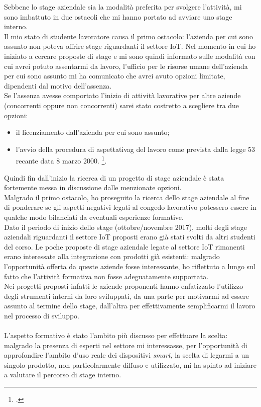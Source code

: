 Sebbene lo stage aziendale sia la modalità preferita per svolgere l'attività, mi sono imbattuto in due ostacoli che mi hanno portato ad avviare uno stage interno. \\
Il mio stato di studente lavoratore causa il primo ostacolo: l'azienda per cui sono assunto non poteva offrire stage riguardanti il settore IoT.
Nel momento in cui ho iniziato a cercare proposte di stage e mi sono quindi informato sulle modalità con cui avrei potuto assentarmi da lavoro,
l'ufficio per le risorse umane dell'azienda per cui sono assunto mi ha comunicato che avrei avuto opzioni limitate, dipendenti dal motivo dell'assenza. \\
Se l'assenza avesse comportato l'inizio di attività lavorative per altre aziende (concorrenti oppure non concorrenti) sarei stato costretto a scegliere tra due opzioni:
\begin{itemize}
  \item il licenziamento dall'azienda per cui sono assunto;
  \item l'avvio della procedura di \gls{aspettativag} del lavoro come prevista dalla legge 53 recante data 8 marzo 2000. \footcite{site:aspettativa}.
\end{itemize}
Quindi fin dall'inizio la ricerca di un progetto di stage aziendale è stata fortemente messa in discussione dalle menzionate opzioni. \\
Malgrado il primo ostacolo, ho proseguito la ricerca dello stage aziendale al fine di ponderare se gli aspetti negativi legati al congedo lavorativo potessero essere in qualche modo bilanciati da eventuali esperienze formative.
\\
Dato il periodo di inizio dello stage (ottobre/novembre 2017), molti degli stage aziendali riguardanti il settore IoT proposti erano già stati svolti da altri studenti del corso.
Le poche proposte di stage aziendale legate al settore IoT rimanenti erano interessate alla integrazione con prodotti già esistenti:
malgrado l'opportunità offerta da queste aziende fosse interessante, ho riflettuto a lungo sul fatto che l'attività formativa non fosse adeguatamente supportata. \\
Nei progetti proposti infatti le aziende proponenti hanno enfatizzato l'utilizzo degli strumenti interni da loro sviluppati, da una parte per motivarmi ad essere assunto al termine dello stage,
dall'altra per effettivamente semplificarmi il lavoro nel processo di sviluppo. \\ \\
L'aspetto formativo è stato l'ambito più discusso per effettuare la scelta: malgrado la presenza di esperti nel settore mi interessasse,
per l'opportunità di approfondire l'ambito d'uso reale dei dispositivi \emph{smart}, la scelta di legarmi a un singolo prodotto, non particolarmente diffuso e utilizzato,
mi ha spinto ad iniziare a valutare il percorso di stage interno. \\

